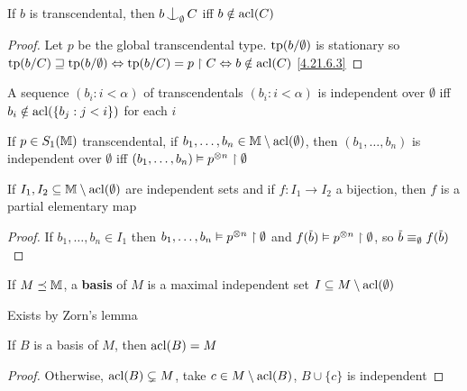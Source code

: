 \documentclass[11pt]{article}
\begin{document}
\begin{lemma}[]
If \(b\) is transcendental, then \(b\ind_{\emptyset}C\) iff \(b\notin\operatorname{acl}(C)\)
\end{lemma}

\begin{proof}
Let \(p\) be the global transcendental type. \(\operatorname{tp}(b/\emptyset)\) is stationary
so \(\operatorname{tp}(b/C)\sqsupseteq\operatorname{tp}(b/\emptyset)\Leftrightarrow\operatorname{tp}(b/C)=p\upharpoonright C\Leftrightarrow b\notin\operatorname{acl}(C)\) \ref{4.21.6.3}
\end{proof}

\begin{proposition}[]
A sequence \((b_i:i<\alpha)\) of transcendentals \((b_i:i<\alpha)\) is independent over \(\emptyset\)
iff \(b_i\notin\operatorname{acl}(\{b_j:j<i\})\) for each \(i\)
\end{proposition}

\begin{remark}
If \(p\in S_1(\mathbb{M})\) transcendental, if \(b_1,\dots,b_n\in\mathbb{M}\setminus\operatorname{acl}(\emptyset)\), then \((b_1,\dots,b_n)\) is independent
over \(\emptyset\) iff \((b_1,\dots,b_n)\vDash p^{\otimes n}\upharpoonright\emptyset\)
\end{remark}

\begin{lemma}[]
If \(I_1,I_2\subseteq\mathbb{M}\setminus\operatorname{acl}(\emptyset)\) are independent sets and if \(f:I_1\to I_2\) a bijection, then \(f\) is a
partial elementary map
\end{lemma}

\begin{proof}
If \(b_1,\dots,b_n\in I_1\) then \(b_1,\dots,b_n\vDash p^{\otimes n}\upharpoonright\emptyset\) and \(f(\barb)\vDash p^{\otimes n}\uhr\emptyset\), so \(\barb\equiv_{\emptyset}f(\barb)\)
\end{proof}

\begin{definition}[]
If \(M\preceq\mathbb{M}\), a \textbf{basis} of \(M\) is a maximal independent set \(I\subseteq M\setminus\operatorname{acl}(\emptyset)\)
\end{definition}

Exists by Zorn's lemma

\begin{proposition}[]
If \(B\) is a basis of \(M\), then \(\operatorname{acl}(B)=M\)
\end{proposition}

\begin{proof}
Otherwise, \(\operatorname{acl}(B)\subsetneq M\), take \(c\in M\setminus\operatorname{acl}(B)\), \(B\cup\{c\}\) is independent
\end{proof}
\end{document}

